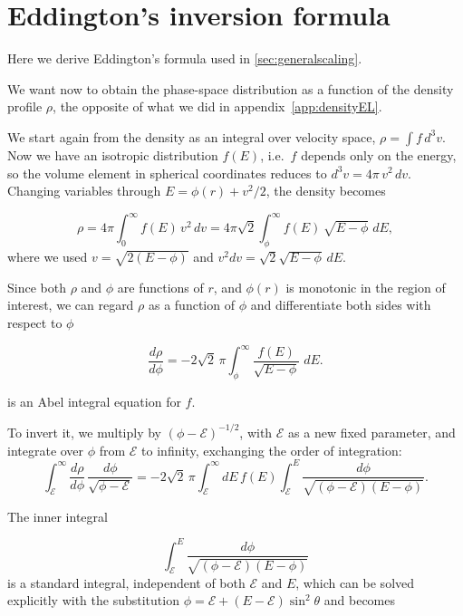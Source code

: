 \section{Eddington's inversion formula}
\label{app:eddington}

Here we derive Eddington's formula used in \cref{sec:generalscaling}.

We want now to obtain the phase-space distribution as a function of the density profile $\rho$,
the opposite of what we did in appendix~\ref{app:densityEL}.

We start again from the density as an integral over velocity space, 
$\rho = \int f\, d^3v$.
Now we have an isotropic distribution $f(E)$, i.e.\ $f$ depends only on the energy,
so the volume element in spherical coordinates reduces to $d^3v = 4\pi\, v^2\, dv$. 
Changing variables through $E = \phi(r) + v^2/2$, the density becomes

\begin{equation}
\rho = 4\pi \int_0^{\infty} f(E)\, v^2\, dv
= 4\pi\sqrt{2} \int_{\phi}^{\infty} f(E)\, \sqrt{E - \phi}\; dE ,
\label{eq:app_rhof}
\end{equation}
where we used $v = \sqrt{2(E-\phi)}$ and $v^2 dv = \sqrt{2}\sqrt{E-\phi}\, dE$.

Since both $\rho$ and $\phi$ are functions of $r$, and $\phi(r)$ is monotonic 
in the region of interest, we can regard
$\rho$ as a function of $\phi$ and differentiate both sides with respect to $\phi$

\begin{equation}
\frac{d\rho}{d\phi}
= -2\sqrt{2}\,\pi \int_{\phi}^{\infty} \frac{f(E)}{\sqrt{E-\phi}}\; dE .
\label{eq:app_abel}
\end{equation}

 is an Abel integral equation for $f$.

To invert it, we multiply by
$(\phi - \mathcal{E})^{-1/2}$, with $\mathcal{E}$ as a new fixed parameter, and integrate over $\phi$ from $\mathcal{E}$ to
infinity, exchanging the order of integration:
\begin{equation} \label{rho_eddington}
\int_{\mathcal{E}}^{\infty} \frac{d\rho}{d\phi}\,
\frac{d\phi}{\sqrt{\phi-\mathcal{E}}}
= -2\sqrt{2}\,\pi \int_{\mathcal{E}}^{\infty} dE\, f(E)
\int_{\mathcal{E}}^{E} \frac{d\phi}{\sqrt{(\phi-\mathcal{E})(E-\phi)}} .
\end{equation}

The inner integral

\begin{equation}
\int_{\mathcal{E}}^{E} \frac{d\phi}{\sqrt{(\phi-\mathcal{E})(E-\phi)}} 
\end{equation}
is a standard integral, independent of both $\mathcal{E}$ and $E$, which can be 
solved explicitly with the substitution $\phi = \mathcal{E} + (E-\mathcal{E})\sin^2\theta$
and becomes


